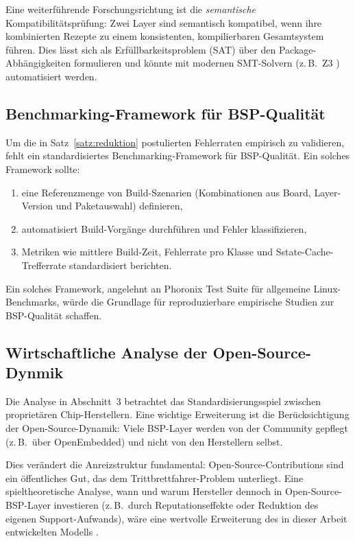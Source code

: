 ﻿\documentclass[a4paper,12pt]{article}
\theoremstyle{definition}
\begin{document}
Eine weiterführende Forschungsrichtung ist die \emph{semantische} Kompatibilitätsprüfung:
Zwei Layer sind semantisch kompatibel, wenn ihre kombinierten Rezepte zu einem
konsistenten, kompilierbaren Gesamtsystem führen. Dies lässt sich als
Erfüllbarkeitsproblem (SAT) über den Package-Abhängigkeiten formulieren \cite{tucker2007}
und könnte mit modernen SMT-Solvern (z.\,B.\ Z3 \cite{demoura2008}) automatisiert werden.

\subsection{Benchmarking-Framework für BSP-Qualität}

Um die in Satz~\ref{satz:reduktion} postulierten Fehlerraten empirisch zu validieren,
fehlt ein standardisiertes Benchmarking-Framework für BSP-Qualität.
Ein solches Framework sollte:
\begin{enumerate}
	\item eine Referenzmenge von Build-Szenarien (Kombinationen aus Board, Layer-Version
	      und Paketauswahl) definieren,
	\item automatisiert Build-Vorgänge durchführen und Fehler klassifizieren,
	\item Metriken wie mittlere Build-Zeit, Fehlerrate pro Klasse und
	      Sstate-Cache-Trefferrate standardisiert berichten.
\end{enumerate}

Ein solches Framework, angelehnt an Phoronix Test Suite \cite{phoronix2024}
für allgemeine Linux-Benchmarks, würde die Grundlage für reproduzierbare
empirische Studien zur BSP-Qualität schaffen.

\subsection{Wirtschaftliche Analyse der Open-Source-Dynmik}

Die Analyse in Abschnitt~3 betrachtet das Standardisierungsspiel zwischen
proprietären Chip-Herstellern. Eine wichtige Erweiterung ist die
Berücksichtigung der Open-Source-Dynamik: Viele BSP-Layer werden von der
Community gepflegt (z.\,B.\ über OpenEmbedded) und nicht von den Herstellern selbst.

Dies verändert die Anreizstruktur fundamental: Open-Source-Contributions
sind ein öffentliches Gut, das dem Trittbrettfahrer-Problem unterliegt.
Eine spieltheoretische Analyse, wann und warum Hersteller dennoch in
Open-Source-BSP-Layer investieren (z.\,B.\ durch Reputationseffekte oder
Reduktion des eigenen Support-Aufwands), wäre eine wertvolle Erweiterung
des in dieser Arbeit entwickelten Modells \cite{lerner2002}.
\end{document}

